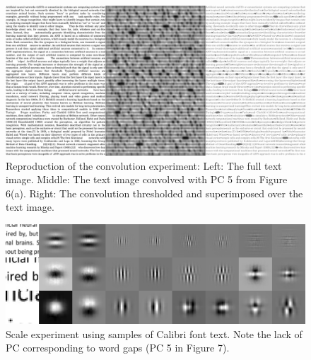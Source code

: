 \begin{figure}
    \centering
    \includegraphics[scale=0.15]{figures/julia-fig8.png}
    \caption{Reproduction of the convolution experiment: Left: The full text image. Middle: The text image convolved with PC 5 from Figure 6(a). Right: The convolution thresholded and superimposed over the text image.}
    \label{fig:Figure8}
\end{figure}
\begin{figure}
    \centering
    \includegraphics[scale=0.34]{figures/julia-fig9.png}
    \caption{Scale experiment using samples of Calibri font text. Note the lack of PC corresponding to word gaps (PC 5 in Figure 7).}
    \label{fig:Figure9}
\end{figure}

